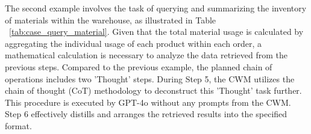 \documentclass[preprint,12pt]{elsarticle}
\providecommand{\DIFaddend}{} %
\DeclareRobustCommand{\DIFaddend}{\DIFOaddend \let\includegraphics\DIFOincludegraphics} %
\begin{document}
\DIFaddend The second example involves the task of querying and summarizing the inventory of materials within the warehouse, as illustrated in Table ~\ref{tab:case_query_material}. 
Given that the total material usage is calculated by aggregating the individual usage of each product within each order, a mathematical calculation is necessary to analyze the data retrieved from the previous steps. 
Compared to the previous example, the planned chain of operations includes two 'Thought' steps. 
During Step 5, the CWM utilizes the chain of thought (CoT) methodology to deconstruct this 'Thought' task further. 
This procedure is executed by GPT-4o without any prompts from the CWM. 
Step 6 effectively distills and arranges the retrieved results into the specified format.




\end{document}
